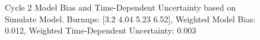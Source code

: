 \begin{figure}[htbp]
{\begin{tikzpicture}[x=1in,y=1in]
      \end{tikzpicture}
    }
    


    \caption{Cycle 2 Model Bias and Time-Dependent Uncertainty based on Simulate Model. Burnups: [3.2 4.04 5.23 6.52], Weighted Model Bias: 0.012, Weighted Time-Dependent Uncertainty: 0.003 \label{fig:sim-cyc2-eighth-map-3.2-4.04-5.23-6.52}}
\end{figure}

